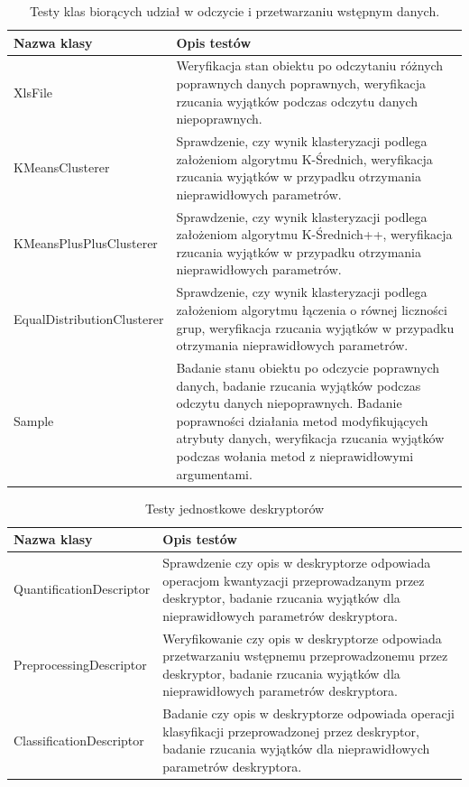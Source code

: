 \documentclass[../thesis.tex]{subfiles}
\begin{document}
\begin{table}[h]
\centering
\begin{tabular}{ p{40mm} | p{110mm} }
Nazwa klasy & Opis testów \\
\hline
XlsFile & Weryfikacja stan obiektu po odczytaniu różnych poprawnych danych poprawnych, weryfikacja rzucania wyjątków podczas odczytu danych niepoprawnych. \\
KMeansClusterer & Sprawdzenie, czy wynik klasteryzacji podlega założeniom algorytmu K-Średnich, weryfikacja rzucania wyjątków w przypadku otrzymania nieprawidłowych parametrów. \\
KMeansPlusPlus\-Clusterer & Sprawdzenie, czy wynik klasteryzacji podlega założeniom algorytmu K-Średnich++, weryfikacja rzucania wyjątków w przypadku otrzymania nieprawidłowych parametrów. \\
EqualDistribution\-Clusterer & Sprawdzenie, czy wynik klasteryzacji podlega założeniom algorytmu łączenia o równej liczności grup, weryfikacja rzucania wyjątków w przypadku otrzymania nieprawidłowych parametrów. \\
Sample & Badanie stanu obiektu po odczycie poprawnych danych, badanie rzucania wyjątków podczas odczytu danych niepoprawnych. Badanie poprawności działania metod modyfikujących atrybuty danych, weryfikacja rzucania wyjątków podczas wołania metod z nieprawidłowymi argumentami. \\
\end{tabular}
\caption{Testy klas biorących udział w odczycie i przetwarzaniu wstępnym danych.}
\label{proj:lib_input_uts}
\end{table}

\begin{table}[h]
\centering
\begin{tabular}{ p{40mm} | p{110mm} }
Nazwa klasy & Opis testów \\
\hline
Quantification\-Descriptor & Sprawdzenie czy opis w deskryptorze odpowiada operacjom kwantyzacji przeprowadzanym przez deskryptor, badanie rzucania wyjątków dla nieprawidłowych parametrów deskryptora. \\
Preprocessing\-Descriptor & Weryfikowanie czy opis w deskryptorze odpowiada przetwarzaniu wstępnemu przeprowadzonemu przez deskryptor, badanie rzucania wyjątków dla nieprawidłowych parametrów deskryptora. \\
Classification\-Descriptor & Badanie czy opis w deskryptorze odpowiada operacji klasyfikacji przeprowadzonej przez deskryptor, badanie rzucania wyjątków dla nieprawidłowych parametrów deskryptora. \\
\end{tabular}
\caption{Testy jednostkowe deskryptorów}
\label{proj:lib_descriptor_uts}
\end{table}
\end{document}
